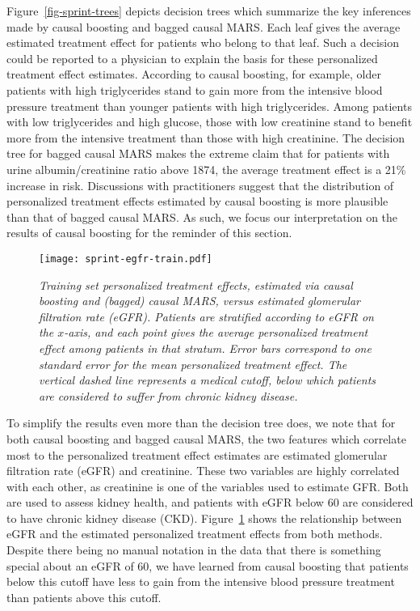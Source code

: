 \documentclass{article}
\begin{document}
Figure~\ref{fig-sprint-trees} depicts decision trees which summarize the key
inferences made by causal boosting and bagged causal MARS. Each leaf gives the
average estimated treatment
effect for patients who belong to that leaf. Such a decision could be reported
to a physician to explain the basis for these personalized treatment effect
estimates. According to causal boosting, for example, older patients with high
triglycerides stand to gain more from the intensive blood pressure treatment
than younger patients with high triglycerides. Among patients with low
triglycerides and high glucose, those with low creatinine stand to benefit more
from the intensive treatment than those with high creatinine. The decision tree
for bagged causal MARS makes the extreme claim that for patients with urine
albumin/creatinine ratio above 1874, the average treatment effect is a 21\%
increase in risk. Discussions with practitioners suggest that the distribution
of personalized treatment effects estimated by causal boosting is more
plausible than that of bagged causal MARS. As such, we focus our interpretation
on the results of causal boosting for the reminder of this section.

\begin{figure}
\caption{\it Training set personalized treatment effects, estimated via causal
  boosting and (bagged) causal MARS, versus estimated glomerular filtration
  rate (eGFR). Patients are stratified according to eGFR on
  the $x$-axis, and each point gives the average personalized treatment effect
  among patients in that stratum. Error bars correspond to one standard error
  for the mean personalized treatment effect. The vertical dashed line
  represents a medical cutoff, below which patients are considered to suffer
  from chronic kidney disease.}
\label{fig-sprint-egfr-train}
\centering
\texttt{[image: sprint-egfr-train.pdf]}
\end{figure}

To simplify the results even more than the decision tree does, we note that for
both causal boosting and bagged causal MARS, the two features which correlate
most to
the personalized treatment effect estimates are estimated glomerular filtration
rate (eGFR) and creatinine. These two variables are highly correlated with each
other, as creatinine is one of the variables used to estimate GFR. Both are
used to assess kidney health, and patients with eGFR below 60 are considered
to have chronic kidney disease (CKD). Figure~\ref{fig-sprint-egfr-train}
shows the
relationship between eGFR and the estimated personalized treatment effects from
both methods. Despite there being no manual notation in the data that there
is something special about an eGFR of 60, we have learned from causal boosting
that patients below this cutoff have less to gain from the intensive blood
pressure treatment than patients above this cutoff.
\end{document}
